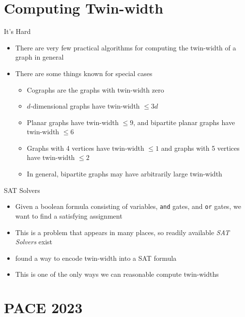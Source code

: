 \documentclass[aspectratio=169]{beamer}
\begin{document}
\section{Computing Twin-width}
\frame{\sectionpage}

\begin{frame}{It's Hard}
    \begin{itemize}
        \item There are very few practical algorithms for computing the twin-width of a graph in general \pause
        \item There are some things known for special cases
        \begin{itemize}
            \item Cographs are the graphs with twin-width zero 
            \item $d$-dimensional graphs have twin-width $\leq 3d$ \cite{Twin-width-I}
            \item Planar graphs have twin-width $\leq 9$, and bipartite planar graphs have twin-width $\leq 6$ \cite{planar}
            \item Graphs with 4 vertices have twin-width $\leq 1$ and graphs with 5 vertices have twin-width $\leq 2$ \cite{computation}
            \item In general, bipartite graphs may have arbitrarily large twin-width
        \end{itemize}
    \end{itemize}
\end{frame}

\begin{frame}{SAT Solvers}
    \begin{itemize}
        \item Given a boolean formula consisting of variables, \texttt{and} gates, and \texttt{or} gates, we want to find a satisfying assignment \pause
        \item This is a problem that appears in many places, so readily available \textcolor{sigma@mainblue}{\emph{SAT Solvers}} exist \pause
        \item \cite{SAT} found a way to encode twin-width into a SAT formula
        \item This is one of the only ways we can reasonable compute twin-widths
    \end{itemize}
\end{frame}

\section{PACE 2023}
\frame{\sectionpage}
\end{document}
